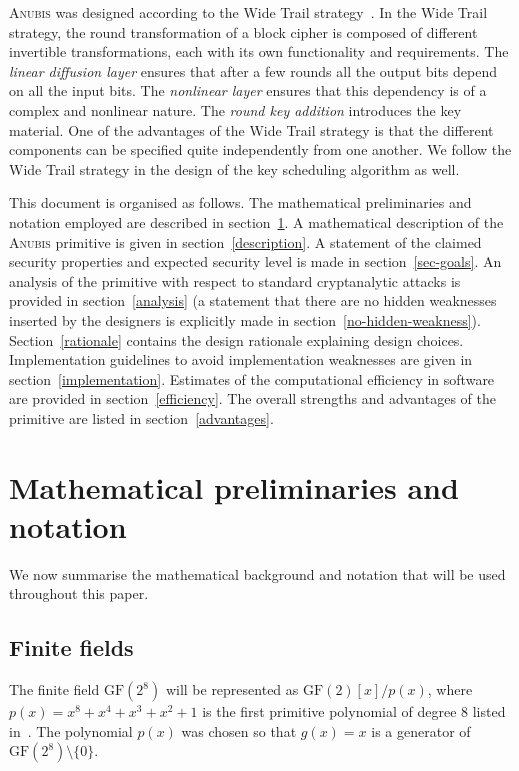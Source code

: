 \documentclass{llncs}
\newcommand{\GF}{\mathrm{GF}}
\begin{document}
\textsc{Anubis} was designed according to the Wide Trail
strategy~\cite{joan}. In the Wide Trail strategy, the round
transformation of a block cipher is composed of different
invertible transformations, each with its own functionality and
requirements.  The \emph{linear diffusion layer} ensures that
after a few rounds all the output bits depend on all the input
bits. The \emph{nonlinear layer} ensures that this dependency is
of a complex and nonlinear nature. The \emph{round key addition}
introduces the key material. One of the advantages of the Wide
Trail strategy is that the different components can be specified
quite independently from one another. We follow the Wide Trail
strategy in the design of the key scheduling algorithm as well.

This document is organised as follows. The mathematical
preliminaries and notation employed are described in
section~\ref{preliminaries}. A mathematical description of the
\textsc{Anubis} primitive is given in section~\ref{description}. A
statement of the claimed security properties and expected
security level is made in section~\ref{sec-goals}. An analysis of
the primitive with respect to standard cryptanalytic attacks is
provided in section~\ref{analysis} (a statement that there are no
hidden weaknesses inserted by the designers is explicitly made in
section~\ref{no-hidden-weakness}). Section~\ref{rationale}
contains the design rationale explaining design choices.
Implementation guidelines to avoid implementation weaknesses are
given in section~\ref{implementation}. Estimates of the
computational efficiency in software are provided in
section~\ref{efficiency}. The overall strengths and advantages of
the primitive are listed in section~\ref{advantages}.

\section{Mathematical preliminaries and notation}\label{preliminaries}

We now summarise the mathematical background and notation that
will be used throughout this paper.

\subsection{Finite fields}

The finite field $\GF(2^8)$ will be represented as
$\GF(2)[x]/p(x)$, where $p(x) = x^8 + x^4 + x^3 + x^2 + 1$ is the
first primitive polynomial of degree 8 listed
in~\cite{lidl-niederreiter}.
The polynomial $p(x)$ was chosen so
that $g(x) = x$ is a generator of $\GF(2^8) \setminus \{0\}$.
\end{document}
